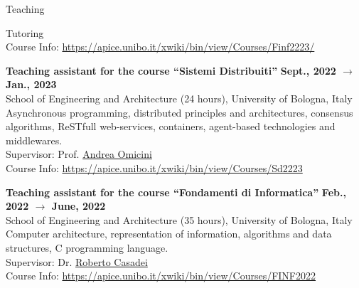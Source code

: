 \documentclass{resume} %
\begin{document}
\begin{rSection}{Teaching}
\begin{rSubsection2}{Tutoring}
            \\Course Info: \url{https://apice.unibo.it/xwiki/bin/view/Courses/Finf2223/}
            \item\textbf{ Teaching assistant for the course ``Sistemi Distribuiti'' }\hfill \textbf{Sept., 2022 $\rightarrow$ Jan., 2023}
            \\School of Engineering and Architecture (24 hours), University of Bologna, Italy
            \\Asynchronous programming, distributed principles and architectures, consensus algorithms, ReSTfull web-services, containers, agent-based technologies and middlewares.
            \\Supervisor: Prof. \href{mailto:andrea.omicini@unibo.it}{Andrea Omicini}
            \\Course Info: \url{https://apice.unibo.it/xwiki/bin/view/Courses/Sd2223}
            \item\textbf{ Teaching assistant for the course ``Fondamenti di Informatica'' }\hfill \textbf{Feb., 2022 $\rightarrow$ June, 2022}
            \\School of Engineering and Architecture (35 hours), University of Bologna, Italy
            \\Computer architecture, representation of information, algorithms and data structures, C programming language.
            \\Supervisor: Dr. \href{mailto:roberto.casadei@unibo.it}{Roberto Casadei}
            \\Course Info: \url{https://apice.unibo.it/xwiki/bin/view/Courses/FINF2022}
        \end{rSubsection2}



\end{rSection}
\end{document}
